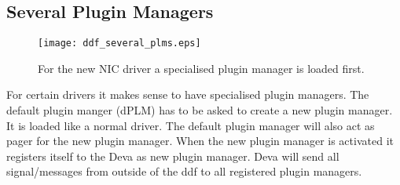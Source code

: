 \subsection{Several Plugin Managers}

\begin{figure}
  \begin{center}
    \leavevmode 
    \texttt{[image: ddf\_several\_plms.eps]}
  \end{center}
  \caption[Several plugin managers]{For the new NIC driver a
  specialised plugin manager is loaded first.}
  \label{fig:ddf_several_plms}
\end{figure}

For certain drivers it makes sense to have specialised plugin
managers.  The default plugin manger (dPLM) has to be asked to create
a new plugin manager.  It is loaded like a normal driver.  The default
plugin manager will also act as pager for the new plugin manager.
When the new plugin manager is activated it registers itself to the
Deva as new plugin manager.  Deva will send all signal/messages from
outside of the ddf to all registered plugin managers.

